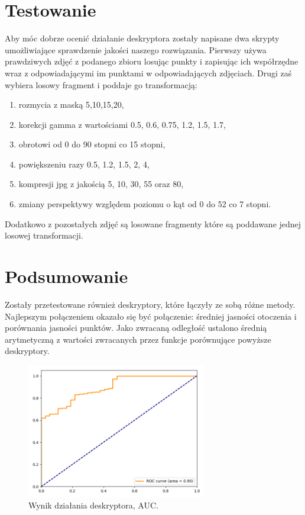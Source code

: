 \documentclass[a4paper,11pt]{article}
\begin{document}
\section{Testowanie}
Aby móc dobrze ocenić działanie deskryptora zostały napisane dwa skrypty umożliwiające sprawdzenie jakości naszego rozwiązania. Pierwszy używa prawdziwych zdjęć z podanego zbioru losując punkty i zapisując ich współrzędne wraz z odpowiadającymi im punktami w odpowiadających zdjęciach. Drugi zaś wybiera losowy fragment i poddaje go transformacją:
\begin{enumerate}
\item rozmycia z maską 5,10,15,20,
\item korekcji gamma z wartościami 0.5, 0.6, 0.75, 1.2, 1.5, 1.7,
\item obrotowi od 0 do 90 stopni co 15 stopni,
\item powiększeniu razy 0.5, 1.2, 1.5, 2, 4,
\item kompresji jpg z jakością 5, 10, 30, 55 oraz 80,
\item zmiany perspektywy względem poziomu o kąt od 0 do 52 co 7 stopni.

\end{enumerate}
Dodatkowo z pozostałych zdjęć są losowane fragmenty które są poddawane jednej losowej transformacji.

\section{Podsumowanie}
Zostały przetestowane również deskryptory, które łączyły ze sobą różne metody.
Najlepszym połączeniem okazało się być połączenie: średniej jasności otoczenia i porównania jasności punktów.
Jako zwracaną odległość ustalono średnią arytmetyczną z wartości zwracanych przez funkcje porównujące powyższe deskryptory.

\begin{figure}[H]
\begin{center}
\includegraphics[width=0.7\textwidth]{./img/average_and_brief.png}
\end{center}
\caption{Wynik działania deskryptora, AUC.}
\end{figure}
\end{document}
